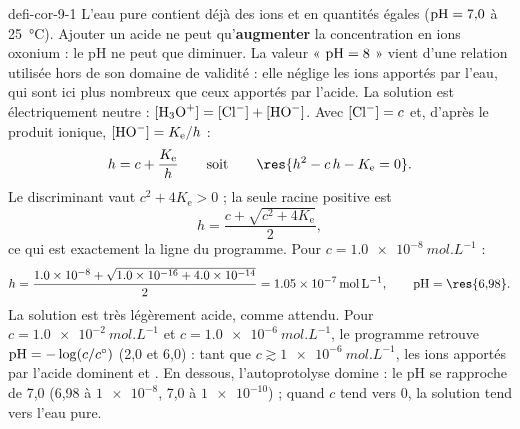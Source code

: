\begin{blocEdition}{defi-cor-9-1}
L'eau pure contient déjà des ions  et  en quantités égales ($\mathrm{pH}=7{,}0$ à 25~°C). Ajouter un acide ne
peut qu'\textbf{augmenter} la concentration en ions oxonium : le pH ne peut que diminuer. La valeur « $\mathrm{pH}=8$ » vient
d'une relation utilisée hors de son domaine de validité : elle néglige les ions  apportés par l'eau, qui sont
ici plus nombreux que ceux apportés par l'acide.
La solution est électriquement neutre : $[\ce{H3O+}]=[\ce{Cl-}]+[\ce{HO-}]$. Avec $[\ce{Cl-}]=c$ et, d'après le produit
ionique, $[\ce{HO-}]=K_\mathrm{e}/h$ :
\[h=c+\frac{K_\mathrm{e}}{h}\qquad\text{soit}\qquad\res{h^2-c\,h-K_\mathrm{e}=0}.\]
Le discriminant vaut $c^2+4K_\mathrm{e}>0$ ; la seule racine positive est
\[h=\frac{c+\sqrt{c^2+4K_\mathrm{e}}}{2},\]
ce qui est exactement la ligne  du programme. Pour $c=\qty{1,0e-8}{mol.L^{-1}}$ :
\[h=\frac{\num{1.0e-8}+\sqrt{\num{1.0e-16}+\num{4.0e-14}}}{2}=\qty{1,05e-7}{mol.L^{-1}},\qquad\pH=\res{6{,}98}.\]
La solution est très légèrement acide, comme attendu.
Pour $c=\qty{1,0e-2}{mol.L^{-1}}$ et $c=\qty{1,0e-6}{mol.L^{-1}}$, le programme retrouve $\mathrm{pH}=-\log(c/c^{\circ})$ (2,0 et
6,0) : tant que $c\gtrsim\qty{1e-6}{mol.L^{-1}}$, les ions apportés par l'acide dominent et . En dessous, l'autoprotolyse domine : le pH se rapproche de 7,0 (6,98 à $\num{1e-8}$, 7,0 à
$\num{1e-10}$) ;  quand $c$ tend vers 0, la solution tend vers l'eau pure.
\end{blocEdition}


